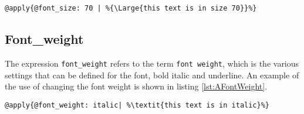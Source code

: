 \begin{lstlisting}[frame=single, caption=Changing font size, label=lst:AFontSize]
	@apply{@font_size: 70 | %{\Large{this text is in size 70}}%}
\end{lstlisting}

\subsection{Font\_weight}
The expression \texttt{font\_weight} refers to the term \texttt{font weight}, which is the various settings that can be defined for the font, bold italic and underline. An example of the use of changing the font weight is shown in listing \ref{lst:AFontWeight}.

\begin{lstlisting}[frame=single, caption=Changing font weight, label=lst:AFontWeight]
	@apply{@font_weight: italic| %\textit{this text is in italic}%}
\end{lstlisting}